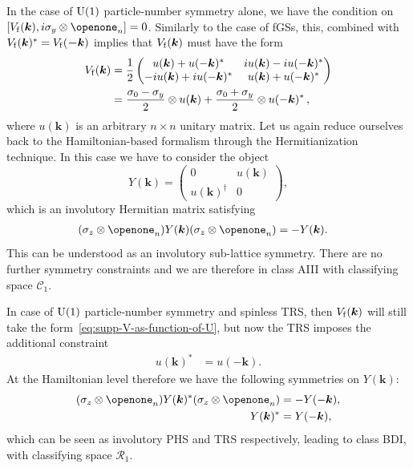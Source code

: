 \documentclass[prl,twocolumn,preprintnumbers,superscriptaddress,amsmath,amssymb]{revtex4-1}
\begin{document}
In the case of ${\rm U}(1)$ particle-number symmetry alone, we have the condition on $[V_{\rm f}(\boldsymbol{k}),i\sigma_y\otimes\openone_n]=0$. Similarly to the case of fGSs, this, combined with $V_{\rm f}(\boldsymbol{k})^*=V_{\rm f}(\boldsymbol{-k})$ implies that $V_{\rm f}(\boldsymbol{k})$ must have the form
\begin{align}
V_{\rm f}(\boldsymbol{k})&=\frac{1}{2}\begin{pmatrix} u(\boldsymbol{k}) + u(-\boldsymbol{k})^* & iu(\boldsymbol{k}) - iu(-\boldsymbol{k})^* \\ - iu(\boldsymbol{k}) + iu(-\boldsymbol{k})^* & u(\boldsymbol{k}) + u(-\boldsymbol{k})^* \end{pmatrix} \nonumber\\
&= \frac{\sigma_0-\sigma_y}{2}\otimes u(\boldsymbol{k}) + \frac{\sigma_0+\sigma_y}{2}\otimes u(-\boldsymbol{k})^*\,,
\label{eq:supp-V-as-function-of-U}
\end{align}
where $u(\boldsymbol{k})$ is an arbitrary $n\times n$ unitary matrix. Let us again reduce ourselves back to the Hamiltonian-based formalism through the Hermitianization technique. In this case we have to consider the object
\begin{equation}
    Y(\boldsymbol{k})=\begin{pmatrix} 0 & u(\boldsymbol{k}) \\ u(\boldsymbol{k})^\dag & 0 \end{pmatrix},
    \label{eq:supp-Y}
\end{equation}
which is an involutory Hermitian matrix satisfying
\begin{align}
     (\sigma_z \otimes \openone_{n}) Y(\boldsymbol{k}) (\sigma_z \otimes \openone_{n}) &= -Y(\boldsymbol{k}) \label{eq:supp-Y-chiral}.
\end{align}
This can be understood as an involutory sub-lattice symmetry. There are no further symmetry constraints and we are therefore in class AIII with classifying space $\mathcal{C}_1$. 

In case of ${\rm U}(1)$ particle-number symmetry and spinless TRS, then $V_{\rm f}(\boldsymbol{k})$ will still take the form~\eqref{eq:supp-V-as-function-of-U}, but now the TRS imposes the additional constraint
\begin{align}
     u(\boldsymbol{k})^* &= u(-\boldsymbol{k}).
     \label{AIV}
\end{align}
At the Hamiltonian level therefore we have the following symmetries on $Y(\boldsymbol{k})$:
\begin{align}
    (\sigma_z \otimes \openone_{n}) Y(\boldsymbol{k})^* (\sigma_z \otimes \openone_{n}) &= -Y(-\boldsymbol{k}),\\
    Y(\boldsymbol{k})^* &= Y(-\boldsymbol{k}),
\end{align}
which can be seen as involutory PHS and TRS respectively, leading to class BDI, with classifying space $\mathcal{R}_1$.
\end{document}

